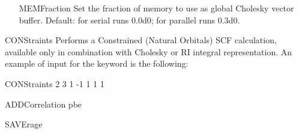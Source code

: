 \begin{keywordlist}
\begin{itemize}
\item[MEMFraction]
Set the fraction of memory to use as global Cholesky vector buffer.
Default: for serial runs 0.0d0; for parallel runs 0.3d0.
\end{itemize}
\item[CONStraints]
Performs a Constrained (Natural Orbitals) SCF calculation, available only in combination with Cholesky or RI integral representation.
An example of input for the keyword  is the following:
\begin{inputlisting}

CONStraints
 2  3
 1 -1
 1  1  1

ADDCorrelation
pbe

SAVErage


\end{inputlisting}
\end{keywordlist}
